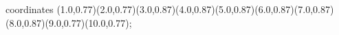 					coordinates { (1.0,0.77)(2.0,0.77)(3.0,0.87)(4.0,0.87)(5.0,0.87)(6.0,0.87)(7.0,0.87)(8.0,0.87)(9.0,0.77)(10.0,0.77)};